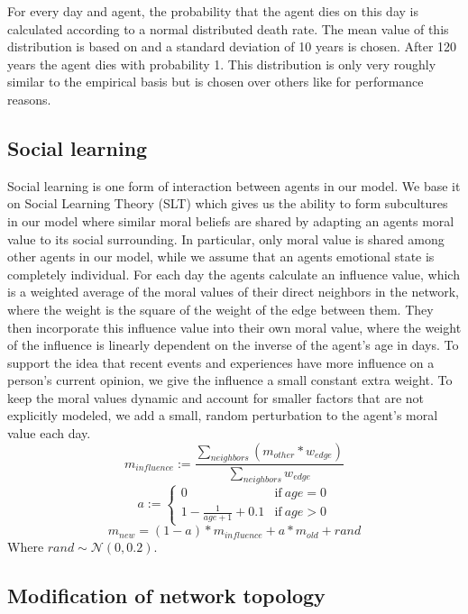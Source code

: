 \documentclass{JASSS}
\begin{document}
    For every day and agent, the probability that the agent dies on this day is calculated according to a normal distributed death rate.
    The mean value of this distribution is based on \citet{lifeexpectancy} and a standard deviation of 10 years is chosen.
    After 120 years the agent dies with probability 1.
    This distribution is only very roughly similar to the empirical basis but is chosen over others like \citet{deathrate} for performance reasons. \label{birthdeath}

    \subsection{Social learning}

    Social learning is one form of interaction between agents in our model.
    We base it on Social Learning Theory (SLT) \citep{sociallearning} which gives us the ability to form subcultures in our model where similar moral beliefs are shared by adapting an agents moral value to its social surrounding.
    In particular, only moral value is shared among other agents in our model, while we assume that an agents emotional state is completely individual.
	For each day the agents calculate an influence value, which is a weighted average of the moral
	values of their direct neighbors in the network, where the weight is the square of the weight
	of the edge between them. They then incorporate this influence value into their own moral
	value, where the weight of the influence is linearly dependent on the inverse of the agent's
	age in days. To support the idea that recent events and experiences have more influence on a
	person's current opinion, we give the influence a small constant extra weight. To keep the
	moral values dynamic and account for smaller factors that are not explicitly modeled, we add
	a small, random perturbation to the agent's moral value each day.
	$$
		m_{influence} := \frac{\sum_{neighbors} (m_{other} * w_{edge})} {\sum_{neighbors} w_{edge}}
	$$ $$
		a :=
		\begin{cases}
			0 & \text{if}\ age = 0 \\
			1 - \frac{1} {age + 1} + 0.1 & \text{if}\ age > 0
	 	\end{cases}
	$$ $$
		m_{new} = (1 - a) * m_{influence} + a * m_{old} + rand
	$$
	Where $rand \sim \mathcal{N}(0, 0.2)$.

    \subsection{Modification of network topology}
\end{document}
